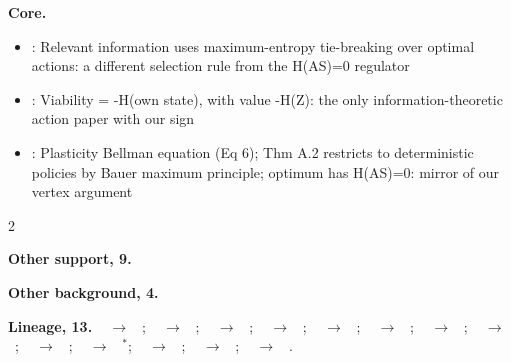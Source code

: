 \documentclass[10pt]{article}
\newcommand{\memb}[1]{\par\smallskip\textbf{#1}\quad}
\begin{document}
\memb{Core.}
\begin{itemize}[nosep,leftmargin=1.2em]
\item \citet{Polani-information01}: Relevant information uses maximum-entropy tie-breaking over optimal actions: a different selection rule from the H(A\textbar{}S)=0 regulator
\item \citet{Kolchinsky-semantic18}: Viability = -H(own state), with value -H(Z): the only information-theoretic action paper with our sign
\item \citet{Lucas-bellman26}: Plasticity Bellman equation (Eq 6); Thm A.2 restricts to deterministic policies by Bauer maximum principle; optimum has H(A\textbar{}S)=0: mirror of our vertex argument
\end{itemize}
\begin{multicols}{2}
\memb{Other support, 9.} \citetext{\citealp{Tishby-information99}; \citealp{Polani-relevant06}; \citealp{Polani-information09}\dag; \citealp{vanDijk-look11}; \citealp{vanDijk-informational13}; \citealp{Abel-state19}; \citealp{Rakelly-which21}; \citealp{Walsh-support26}; \citealp{Abel-plasticity25}}

\memb{Other background, 4.} {\footnotesize \citetext{\citealp{Nehaniv-meaningful02}; \citealp{Polani-informational11}; \citealp{Larsson-information20}; \citealp{Sowinski-semantic23}}}

\end{multicols}
\memb{Lineage, 13.} {\footnotesize \citeauthor{Blahut-computation72}~\citeyear{Blahut-computation72} $\to$ \citeauthor{Tishby-information99}~\citeyear{Tishby-information99}; \citeauthor{Tishby-information99}~\citeyear{Tishby-information99} $\to$ \citeauthor{Polani-information01}~\citeyear{Polani-information01}; \citeauthor{Tishby-information99}~\citeyear{Tishby-information99} $\to$ \citeauthor{Klyubin-empowerment05}~\citeyear{Klyubin-empowerment05}; \citeauthor{Tishby-information99}~\citeyear{Tishby-information99} $\to$ \citeauthor{Klyubin-representations07}~\citeyear{Klyubin-representations07}; \citeauthor{Tishby-information99}~\citeyear{Tishby-information99} $\to$ \citeauthor{Friston-free12c}~\citeyear{Friston-free12c}; \citeauthor{Tishby-information99}~\citeyear{Tishby-information99} $\to$ \citeauthor{Abel-state19}~\citeyear{Abel-state19}; \citeauthor{Polani-information01}~\citeyear{Polani-information01} $\to$ \citeauthor{Polani-relevant06}~\citeyear{Polani-relevant06}; \citeauthor{Klyubin-empowerment05}~\citeyear{Klyubin-empowerment05} $\to$ \citeauthor{Abel-plasticity25}~\citeyear{Abel-plasticity25}; \citeauthor{Polani-relevant06}~\citeyear{Polani-relevant06} $\to$ \citeauthor{vanDijk-informational13}~\citeyear{vanDijk-informational13}; \citeauthor{Polani-relevant06}~\citeyear{Polani-relevant06} $\to$ \citeauthor{Kolchinsky-semantic18}~\citeyear{Kolchinsky-semantic18}$^\ast$; \citeauthor{Leibfried-unified19}~\citeyear{Leibfried-unified19} $\to$ \citeauthor{Lucas-bellman26}~\citeyear{Lucas-bellman26}; \citeauthor{Abel-plasticity25}~\citeyear{Abel-plasticity25} $\to$ \citeauthor{Csaky-prediction26}~\citeyear{Csaky-prediction26}; \citeauthor{Abel-plasticity25}~\citeyear{Abel-plasticity25} $\to$ \citeauthor{Lucas-bellman26}~\citeyear{Lucas-bellman26}.}
\end{document}
